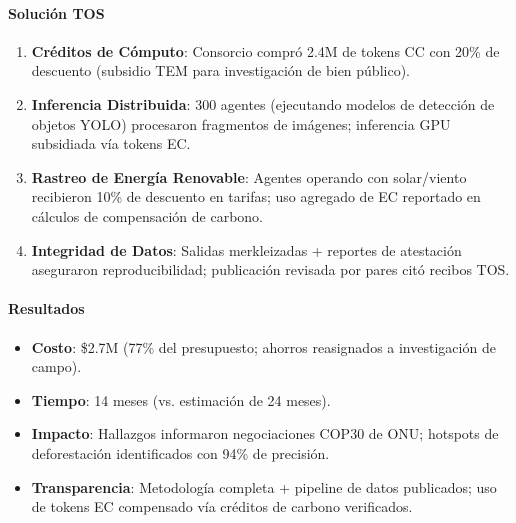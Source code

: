 \documentclass[11pt]{article}
\begin{document}
\paragraph{Solución TOS}
\begin{enumerate}[noitemsep]
  \item \textbf{Créditos de Cómputo}: Consorcio compró 2.4M de tokens CC con 20\% de descuento (subsidio TEM para investigación de bien público).
  \item \textbf{Inferencia Distribuida}: 300 agentes (ejecutando modelos de detección de objetos YOLO) procesaron fragmentos de imágenes; inferencia GPU subsidiada vía tokens EC.
  \item \textbf{Rastreo de Energía Renovable}: Agentes operando con solar/viento recibieron 10\% de descuento en tarifas; uso agregado de EC reportado en cálculos de compensación de carbono.
  \item \textbf{Integridad de Datos}: Salidas merkleizadas + reportes de atestación aseguraron reproducibilidad; publicación revisada por pares citó recibos TOS.
\end{enumerate}

\paragraph{Resultados}
\begin{itemize}[noitemsep]
  \item \textbf{Costo}: \$2.7M (77\% del presupuesto; ahorros reasignados a investigación de campo).
  \item \textbf{Tiempo}: 14 meses (vs. estimación de 24 meses).
  \item \textbf{Impacto}: Hallazgos informaron negociaciones COP30 de ONU; hotspots de deforestación identificados con 94\% de precisión.
  \item \textbf{Transparencia}: Metodología completa + pipeline de datos publicados; uso de tokens EC compensado vía créditos de carbono verificados.
\end{itemize}
\end{document}
